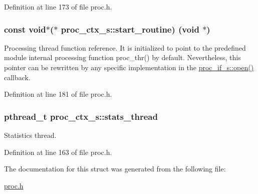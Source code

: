Definition at line 173 of file proc.\+h.

\subsubsection[{\texorpdfstring{start\+\_\+routine}{start_routine}}]{\setlength{\rightskip}{0pt plus 5cm}const void$\ast$($\ast$ proc\+\_\+ctx\+\_\+s\+::start\+\_\+routine) (void $\ast$)}\hypertarget{structproc__ctx__s_a1149ce1c28aae8e553c85125e30be661}{}\label{structproc__ctx__s_a1149ce1c28aae8e553c85125e30be661}
Processing thread function reference. It is initialized to point to the predefined module internal processing function \textquotesingle{}proc\+\_\+thr()\textquotesingle{} by default. Nevertheless, this pointer can be rewritten by any specific implementation in the \textquotesingle{}\hyperlink{structproc__if__s_a34999576771394dfb721463c8455ba06}{proc\+\_\+if\+\_\+s\+::open()}\textquotesingle{} callback. 

Definition at line 181 of file proc.\+h.

\subsubsection[{\texorpdfstring{stats\+\_\+thread}{stats_thread}}]{\setlength{\rightskip}{0pt plus 5cm}pthread\+\_\+t proc\+\_\+ctx\+\_\+s\+::stats\+\_\+thread}\hypertarget{structproc__ctx__s_a9cd9d87dfa63404f23d5571feaefcb71}{}\label{structproc__ctx__s_a9cd9d87dfa63404f23d5571feaefcb71}
Statistics thread. 

Definition at line 163 of file proc.\+h.



The documentation for this struct was generated from the following file\+:\begin{DoxyCompactItemize}
\item 
\hyperlink{proc_8h}{proc.\+h}\end{DoxyCompactItemize}

